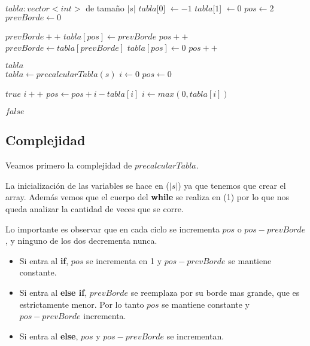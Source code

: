\begin{algorithmic}

    \State $tabla : vector<int>$ de tamaño $|s|$
    \State $tabla$[$0$] $\gets -1$
    \State $tabla$[$1$] $\gets 0$
    \State $pos \gets 2$
    \State $prevBorde \gets 0$

            \State $prevBorde++$
            \State $tabla[pos] \gets prevBorde$
            \State $pos++$
            \State $prevBorde \gets tabla[prevBorde]$
        \Else
            \State $tabla[pos] \gets 0$
            \State $pos++$
        \EndIf
    \EndWhile

    \State \Return $tabla$
\EndFunction
\\

    \State $tabla \gets precalcularTabla(s)$
    \State $i \gets 0$
    \State $pos \gets 0$

                \State \Return $true$
            \EndIf
            \State $i++$
        \Else
            \State $pos \gets pos + i - tabla[i]$
            \State $i \gets max(0, tabla[i])$
        \EndIf
    \EndWhile

    \State \Return $false$
\EndFunction

\subsection{Complejidad}

Veamos primero la complejidad de $precalcularTabla$.

La inicialización de las variables se hace en \bigo($|s|$) ya que tenemos que crear el array.
Además vemos que el cuerpo del \textbf{while} se realiza en \bigo(1) por lo que nos queda analizar la cantidad de veces que se corre.

Lo importante es observar que en cada ciclo se incrementa $pos$ o $pos - prevBorde$, y ninguno de los dos decrementa nunca.

\begin{itemize}
    \item Si entra al \textbf{if}, $pos$ se incrementa en 1 y $pos - prevBorde$ se mantiene constante.
    \item Si entra al \textbf{else if}, $prevBorde$ se reemplaza por su borde mas grande, que es estrictamente menor. Por lo tanto $pos$ se mantiene constante y $pos - prevBorde$ incrementa.
    \item Si entra al \textbf{else}, $pos$ y $pos - prevBorde$ se incrementan.
\end{itemize}


\end{algorithmic}

